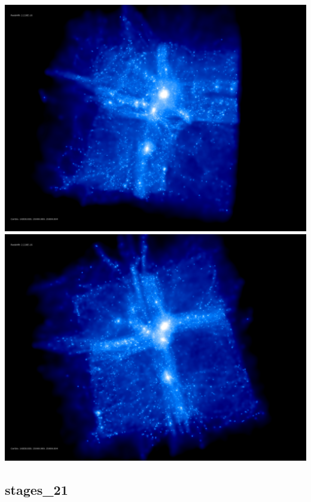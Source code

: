 \includegraphics[scale=0.1]{stages_20/rotate_00074.jpg} 
\includegraphics[scale=0.1]{stages_20/rotate_00131.jpg}


% 
%
%
%
%
%
%
%


\newpage
\subsection{stages\_21}

